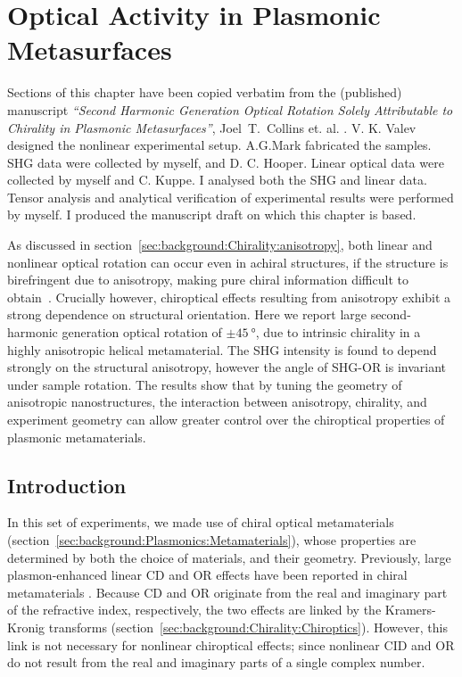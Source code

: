 \chapter{Optical Activity in Plasmonic Metasurfaces}\label{sec:results:OAinPlanarNanohelices}

Sections of this chapter have been copied verbatim from the (published) manuscript \textit{``Second Harmonic Generation Optical Rotation Solely Attributable to Chirality in Plasmonic Metasurfaces''}, Joel~T.~Collins et. al. \cite{Collins2018b}.
V. K. Valev designed the nonlinear experimental setup. A.G.Mark fabricated the samples. SHG data were collected by myself, and D. C. Hooper. Linear optical data were collected by myself and C. Kuppe. I analysed both the SHG and linear data. Tensor analysis and analytical verification of experimental results were performed by myself. I produced the manuscript draft on which this chapter is based.

\bigskip \noindent
As discussed in section~\ref{sec:background:Chirality:anisotropy}, both linear and nonlinear optical rotation can occur even in achiral structures, if the structure is birefringent due to anisotropy, making pure chiral information difficult to obtain~\cite{Hooper2017}. Crucially however, chiroptical effects resulting from anisotropy exhibit a strong dependence on structural orientation. Here we report large second-harmonic generation optical rotation of $\pm\SI{45}{\degree}$, due to intrinsic chirality in a highly anisotropic helical metamaterial. The SHG intensity is found to depend strongly on the structural anisotropy, however the angle of SHG-OR is invariant under sample rotation. The results show that by tuning the geometry of anisotropic nanostructures, the interaction between anisotropy, chirality, and experiment geometry can allow greater control over the chiroptical properties of plasmonic metamaterials.

\section{Introduction}\label{sec:results:OAinPlanarNanohelices:introduction}
In this set of experiments, we made use of chiral optical metamaterials (section~\ref{sec:background:Plasmonics:Metamaterials}), whose properties are determined by both the choice of materials, and their geometry. Previously, large plasmon-enhanced linear CD and OR effects have been reported in chiral metamaterials \cite{Decker2007, Papakostas2003, Kuwata-Gonokami2005a, Plum2007, Gansel2011}.
Because CD and OR originate from the real and imaginary part of the refractive index, respectively, the two effects are linked by the Kramers-Kronig transforms (section~\ref{sec:background:Chirality:Chiroptics}).
However, this link is not necessary for nonlinear chiroptical effects; since nonlinear CID and OR do not result from the real and imaginary parts of a single complex number.

